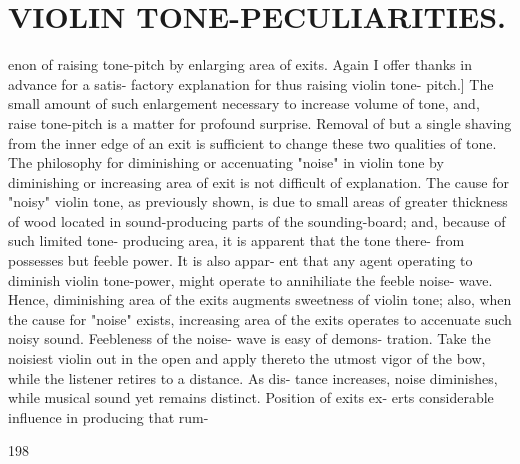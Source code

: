 \documentclass{article}
\begin{document}
\section*{VIOLIN TONE-PECULIARITIES.}
enon of raising tone-pitch by enlarging area of exits. Again I offer thanks in advance for a satis- factory explanation for thus raising violin tone- pitch.] The small amount of such enlargement necessary to increase volume of tone, and, raise tone-pitch is a matter for profound surprise. Removal of but a single shaving from the inner edge of an exit is sufficient to change these two qualities of tone. The philosophy for diminishing or accenuating "noise" in violin tone by diminishing or increasing area of exit is not difficult of explanation. The cause for "noisy" violin tone, as previously shown, is due to small areas of greater thickness of wood located in sound-producing parts of the sounding-board; and, because of such limited tone- producing area, it is apparent that the tone there- from possesses but feeble power. It is also appar- ent that any agent operating to diminish violin tone-power, might operate to annihiliate the feeble noise- wave. Hence, diminishing area of the exits augments sweetness of violin tone; also, when the cause for "noise" exists, increasing area of the exits operates to accenuate such noisy sound. Feebleness of the noise- wave is easy of demons- tration. Take the noisiest violin out in the open and apply thereto the utmost vigor of the bow, while the listener retires to a distance. As dis- tance increases, noise diminishes, while musical sound yet remains distinct. Position of exits ex- erts considerable influence in producing that rum-

198
\end{document}
